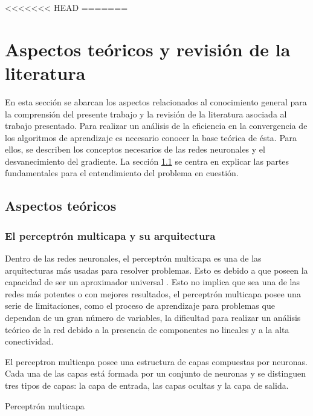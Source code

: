 <<<<<<< HEAD
=======
\chapter{Aspectos teóricos y revisión de la literatura}
En esta sección se abarcan los aspectos relacionados al conocimiento general para la comprensión del presente trabajo y la revisión de la literatura asociada al trabajo presentado. Para realizar un análisis de la eficiencia en la convergencia de los algoritmos de aprendizaje es necesario conocer la base teórica de ésta. Para ellos, se describen los conceptos necesarios de las redes neuronales y el desvanecimiento del gradiente. La sección \ref{sec:aspectos_teoricos} se centra en explicar las partes fundamentales para el entendimiento del problema en cuestión.

\section{Aspectos teóricos}\label{sec:aspectos_teoricos}
\subsection{El perceptrón multicapa y su arquitectura}
Dentro de las redes neuronales, el perceptrón multicapa es una de las arquitecturas más usadas para resolver problemas. Esto es debido a que poseen la capacidad de ser un aproximador universal \cite{Minsky1969b}. Esto no implica que sea una de las redes más potentes o con mejores resultados, el perceptrón multicapa posee una serie de limitaciones, como el proceso de aprendizaje para problemas que dependan de un gran número de variables, la dificultad para realizar un análisis teórico de la red debido a la presencia de componentes no lineales y a la alta conectividad.

El perceptron multicapa posee una estructura de capas compuestas por neuronas. Cada una de las capas está formada por un conjunto de neuronas y se distinguen tres tipos de capas: la capa de entrada, las capas ocultas y la capa de salida.

\begin{imagen}
	\scalebox{0.8}{}
	\caption{Perceptrón multicapa}
	\label{fig:neurona}
\end{imagen}

